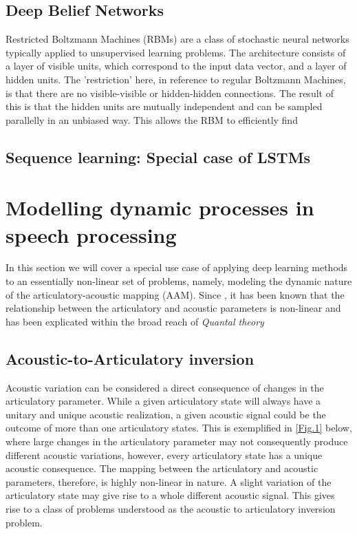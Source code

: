 \documentclass{article}[12pt]
\begin{document}
\subsection{Deep Belief Networks}
Restricted Boltzmann Machines (RBMs) are a class of stochastic neural networks typically applied to unsupervised learning problems. The architecture consists of a layer of visible units, which correspond to the input data vector, and a layer of hidden units. The 'restriction' here, in reference to regular Boltzmann Machines, is that there are no visible-visible or hidden-hidden connections. The result of this is that the hidden units are mutually independent and can be sampled parallelly in an unbiased way. This allows the RBM to efficiently find




\subsection{Sequence learning: Special case of LSTMs}

\section{Modelling dynamic processes in speech processing}
In this section we will cover a special use case of applying deep learning methods to an essentially non-linear set of problems, namely, modeling the dynamic nature of the articulatory-acoustic mapping (AAM). Since \cite{stevens1968}, it has been known that the relationship between the articulatory and acoustic parameters is non-linear and has been explicated within the broad reach of \emph{Quantal theory} \citep{stevens1968}
\subsection{Acoustic-to-Articulatory inversion}
Acoustic variation can be considered a direct consequence of changes in the articulatory parameter. While a given articulatory state will always have a unitary and unique acoustic realization, a given acoustic signal could be the outcome of more than one articulatory states. This is exemplified in \ref{Fig.1} below, where large changes in the articulatory parameter may not consequently produce different acoustic variations, however, every articulatory state has a unique acoustic consequence. The mapping between the articulatory and acoustic parameters, therefore, is highly non-linear in nature. A slight variation of the articulatory state may give rise to a whole different acoustic signal. This gives rise to a class of problems understood as the acoustic to articulatory inversion problem.
\end{document}
